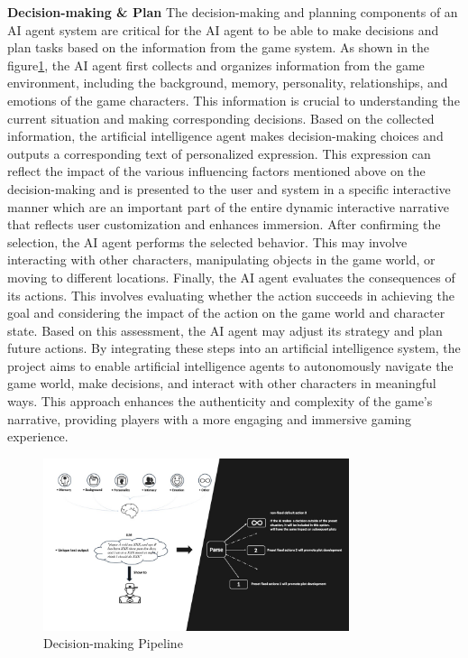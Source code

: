 \textbf{Decision-making \& Plan}\quad
The decision-making and planning components of an AI agent system are critical for the AI agent to be able to make decisions and plan tasks based on the information from the game system. 
As shown in the figure\ref{fig:decision-making}, the AI agent first collects and organizes information from the game environment, including the background, memory, personality, relationships, and emotions of the game characters. 
This information is crucial to understanding the current situation and making corresponding decisions. 
Based on the collected information, the artificial intelligence agent makes decision-making choices and outputs a corresponding text of personalized expression. 
This expression can reflect the impact of the various influencing factors mentioned above on the decision-making and is presented to the user and system in a specific interactive manner which are an important part of the entire dynamic interactive narrative that reflects user customization and enhances immersion. 
After confirming the selection, the AI agent performs the selected behavior. This may involve interacting with other characters, manipulating objects in the game world, or moving to different locations. 
Finally, the AI agent evaluates the consequences of its actions. This involves evaluating whether the action succeeds in achieving the goal and considering the impact of the action on the game world and character state. 
Based on this assessment, the AI agent may adjust its strategy and plan future actions. 
By integrating these steps into an artificial intelligence system, the project aims to enable artificial intelligence agents to autonomously navigate the game world, make decisions, and interact with other characters in meaningful ways. 
This approach enhances the authenticity and complexity of the game's narrative, providing players with a more engaging and immersive gaming experience.
\begin{figure}
    \centering
    \includegraphics[width=0.8\textwidth]{image/decision-making.jpg}
    \caption{Decision-making Pipeline}
  \label{fig:decision-making}
\end{figure}

